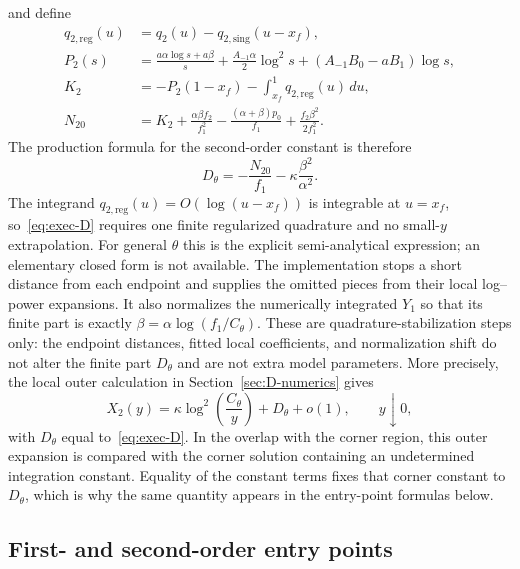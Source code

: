 \documentclass[11pt,a4paper]{article}
\newcommand{\xf}{x_f}
\begin{document}
and define
\begin{align}
 q_{2,\mathrm{reg}}(u)&=q_2(u)-q_{2,\mathrm{sing}}(u-\xf),\nonumber\\
 P_2(s)&=\frac{a\alpha\log s+a\beta}{s}
 +\frac{A_{-1}\alpha}{2}\log^2s
 +(A_{-1}B_0-aB_1)\log s,\nonumber\\
 K_2&=-P_2(1-\xf)-\int_{\xf}^{1}q_{2,\mathrm{reg}}(u)\,du,\nonumber\\
 N_{20}&=K_2+\frac{\alpha\beta f_2}{f_1^2}
 -\frac{(\alpha+\beta)p_0}{f_1}
 +\frac{f_2\beta^2}{2f_1^2}.
 \label{eq:exec-D-parts}
\end{align}
The production formula for the second-order constant is therefore
\begin{equation}
 \boxed{\qquad
 D_\theta=-\frac{N_{20}}{f_1}-\kappa\frac{\beta^2}{\alpha^2}.
 \qquad}
 \label{eq:exec-D}
\end{equation}
The integrand $q_{2,\mathrm{reg}}(u)=O(\log(u-\xf))$ is integrable at
$u=\xf$, so~\eqref{eq:exec-D} requires one finite regularized quadrature and
no small-$y$ extrapolation.  For general $\theta$ this is the explicit
semi-analytical expression; an elementary closed form is not available.  The
implementation stops a short distance from each endpoint and supplies the
omitted pieces from their local log--power expansions.  It also normalizes the
numerically integrated $Y_1$ so that its finite part is exactly
$\beta=\alpha\log(f_1/C_\theta)$.  These are quadrature-stabilization steps
only: the endpoint distances, fitted local coefficients, and normalization
shift do not alter the finite part $D_\theta$ and are not extra model
parameters.
More precisely, the local outer calculation in
Section~\ref{sec:D-numerics} gives
\[
X_2(y)=\kappa\log^2\!\left(\frac{C_\theta}{y}\right)+D_\theta+o(1),
\qquad y\downarrow0,
\]
with $D_\theta$ equal to~\eqref{eq:exec-D}.  In the overlap with the corner
region, this outer expansion is compared with the corner solution containing
an undetermined integration constant.  Equality of the constant terms fixes
that corner constant to $D_\theta$, which is why the same quantity appears in
the entry-point formulas below.

\subsection{First- and second-order entry points}
\end{document}
